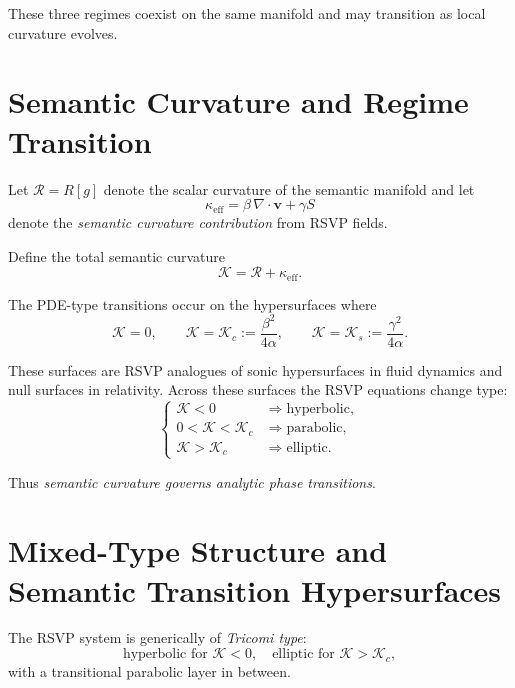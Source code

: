 These three regimes coexist on the same manifold and may transition as
local curvature evolves.

\section{Semantic Curvature and Regime Transition}

Let $\mathcal{R} = R[g]$ denote the scalar curvature of the semantic manifold
and let
\[
\kappa_\mathrm{eff}
=
\beta \,\nabla \cdot \mathbf{v}
+ \gamma S
\]
denote the \emph{semantic curvature contribution}
from RSVP fields.

Define the total semantic curvature
\[
\mathcal{K} = \mathcal{R} + \kappa_\mathrm{eff}.
\]

\begin{definition}
The PDE-type transitions occur on the hypersurfaces where
\[
\mathcal{K} = 0,
\qquad
\mathcal{K} = \mathcal{K}_c := \frac{\beta^2}{4\alpha},
\qquad
\mathcal{K} = \mathcal{K}_s := \frac{\gamma^2}{4\alpha}.
\]
\end{definition}

These surfaces are RSVP analogues of sonic hypersurfaces in fluid dynamics
and null surfaces in relativity.  
Across these surfaces the RSVP equations change type:
\[
\begin{cases}
\mathcal{K} < 0 &\Rightarrow \text{hyperbolic},\\
0 < \mathcal{K} < \mathcal{K}_c &\Rightarrow \text{parabolic},\\
\mathcal{K} > \mathcal{K}_c &\Rightarrow \text{elliptic}.
\end{cases}
\]

Thus \emph{semantic curvature governs analytic phase transitions}.

\section{Mixed-Type Structure and Semantic Transition Hypersurfaces}

The RSVP system is generically of \emph{Tricomi type}:
\[
\text{hyperbolic for } \mathcal{K}<0, 
\quad
\text{elliptic for } \mathcal{K}>\mathcal{K}_c,
\]
with a transitional parabolic layer in between.

